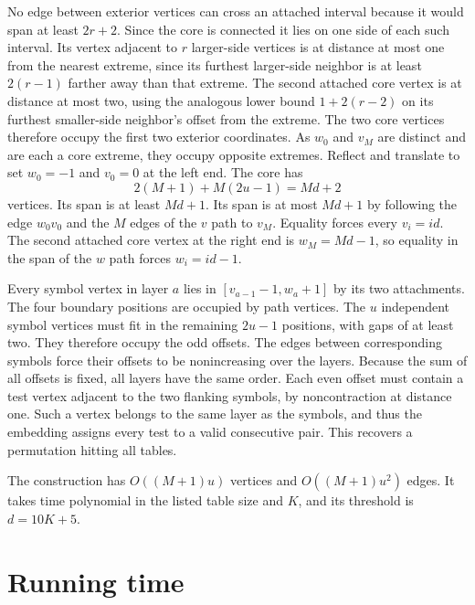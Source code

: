 \documentclass[11pt]{article}
\begin{document}
No edge between exterior vertices can cross an attached interval because it would span at least $2r+2$. Since the core is connected it lies on one side of each such interval. Its vertex adjacent to $r$ larger-side vertices is at distance at most one from the nearest extreme, since its furthest larger-side neighbor is at least $2(r-1)$ farther away than that extreme. The second attached core vertex is at distance at most two, using the analogous lower bound $1+2(r-2)$ on its furthest smaller-side neighbor's offset from the extreme. The two core vertices therefore occupy the first two exterior coordinates. As $w_0$ and $v_M$ are distinct and are each a core extreme, they occupy opposite extremes. Reflect and translate to set $w_0=-1$ and $v_0=0$ at the left end. The core has
\[
 2(M+1)+M(2u-1)=Md+2
\]
vertices. Its span is at least $Md+1$. Its span is at most $Md+1$ by following the edge $w_0v_0$ and the $M$ edges of the $v$ path to $v_M$. Equality forces every $v_i=id$. The second attached core vertex at the right end is $w_M=Md-1$, so equality in the span of the $w$ path forces $w_i=id-1$.

Every symbol vertex in layer $a$ lies in $[v_{a-1}-1,w_a+1]$ by its two attachments. The four boundary positions are occupied by path vertices. The $u$ independent symbol vertices must fit in the remaining $2u-1$ positions, with gaps of at least two. They therefore occupy the odd offsets. The edges between corresponding symbols force their offsets to be nonincreasing over the layers. Because the sum of all offsets is fixed, all layers have the same order. Each even offset must contain a test vertex adjacent to the two flanking symbols, by noncontraction at distance one. Such a vertex belongs to the same layer as the symbols, and thus the embedding assigns every test to a valid consecutive pair. This recovers a permutation hitting all tables.

The construction has $O((M+1)u)$ vertices and $O((M+1)u^2)$ edges. It takes time polynomial in the listed table size and $K$, and its threshold is $d=10K+5$.

\section{Running time}
\end{document}
